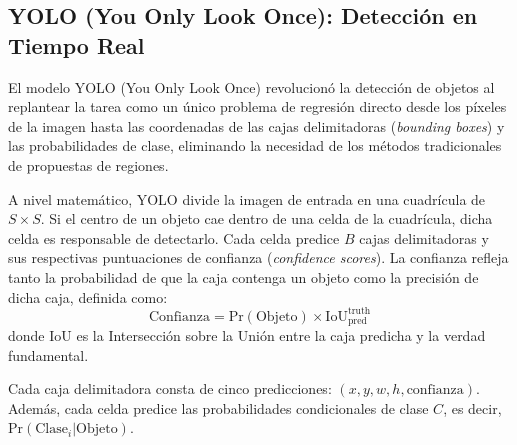 \subsection{YOLO (You Only Look Once): Detección en Tiempo Real}

El modelo YOLO (You Only Look Once) \cite{redmon2016yolo} revolucionó la detección de objetos al replantear la tarea como un único problema de regresión directo desde los píxeles de la imagen hasta las coordenadas de las cajas delimitadoras (\textit{bounding boxes}) y las probabilidades de clase, eliminando la necesidad de los métodos tradicionales de propuestas de regiones.

A nivel matemático, YOLO divide la imagen de entrada en una cuadrícula de $S \times S$. Si el centro de un objeto cae dentro de una celda de la cuadrícula, dicha celda es responsable de detectarlo. Cada celda predice $B$ cajas delimitadoras y sus respectivas puntuaciones de confianza (\textit{confidence scores}). La confianza refleja tanto la probabilidad de que la caja contenga un objeto como la precisión de dicha caja, definida como:
\begin{equation}
    \text{Confianza} = \text{Pr}(\text{Objeto}) \times \text{IoU}_{\text{pred}}^{\text{truth}}
\end{equation}
donde $\text{IoU}$ es la Intersección sobre la Unión entre la caja predicha y la verdad fundamental. 

Cada caja delimitadora consta de cinco predicciones: $(x, y, w, h, \text{confianza})$. Además, cada celda predice las probabilidades condicionales de clase $C$, es decir, $\text{Pr}(\text{Clase}_i | \text{Objeto})$. 

